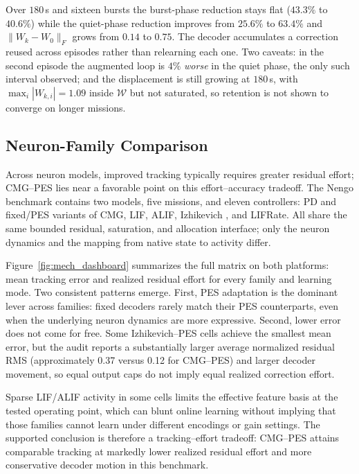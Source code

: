 \documentclass[letterpaper, 10 pt, conference]{ieeeconf}
\begin{document}
Over $180$\,s and sixteen bursts the burst-phase reduction stays flat
($43.3\%$ to $40.6\%$) while the quiet-phase reduction improves from
$25.6\%$ to $63.4\%$ and $\|W_k-W_0\|_F$ grows from $0.14$ to $0.75$. The
decoder accumulates a correction reused across episodes rather than
relearning each one. Two caveats: in the second episode the augmented loop
is $4\%$ \emph{worse} in the quiet phase, the only such interval observed;
and the displacement is still growing at $180$\,s, with
$\max_i|W_{k,i}|=1.09$ inside $\mathcal W$ but not saturated, so retention is
not shown to converge on longer missions.

\subsection{Neuron-Family Comparison}
Across neuron models, improved tracking typically requires greater residual effort; CMG--PES lies near a favorable point on this effort--accuracy tradeoff.
The Nengo benchmark contains two models, five missions, and eleven controllers: PD and fixed/PES variants of CMG, LIF, ALIF, Izhikevich \cite{izhikevich2003}, and LIFRate. All share the same bounded residual, saturation, and allocation interface; only the neuron dynamics and the mapping from native state to activity differ.

Figure~\ref{fig:mech_dashboard} summarizes the full matrix on both
platforms: mean tracking error and realized residual effort for every
family and learning mode. Two consistent patterns emerge. First, PES adaptation is the dominant lever across families: fixed
decoders rarely match their PES counterparts, even when the underlying
neuron dynamics are more expressive. Second, lower error does not come for
free. Some Izhikevich--PES cells achieve the smallest mean error, but the
audit reports a substantially larger average normalized residual RMS
(approximately 0.37 versus 0.12 for CMG--PES) and larger decoder movement,
so equal output caps do not imply equal realized correction effort.

Sparse LIF/ALIF activity in some cells limits the effective feature basis at
the tested operating point, which can blunt online learning without
implying that those families cannot learn under different encodings or gain
settings. The supported conclusion is therefore a tracking--effort tradeoff:
CMG--PES attains comparable tracking at markedly lower realized residual
effort and more conservative decoder motion in this benchmark.
\end{document}
